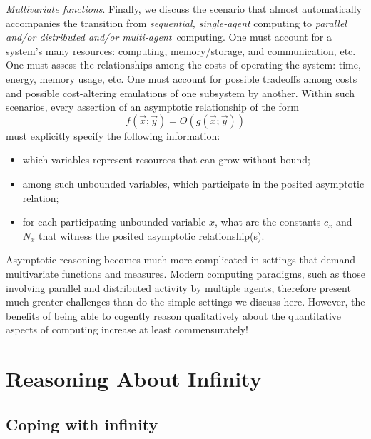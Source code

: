 {\em Multivariate functions}.
Finally, we discuss the scenario that almost automatically accompanies the transition from {\em sequential, single-agent} computing to {\em parallel and/or distributed and/or multi-agent}~computing.  One must account for a system's many resources: computing, memory/storage, and communication, etc.  One must assess the relationships among the costs of operating the system: time, energy, memory usage, etc.  One must account for possible tradeoffs among costs and possible cost-altering emulations of one subsystem by another. Within such scenarios, every assertion of an asymptotic relationship of the form
\[ f(\vec{x}; \vec{y}) = O(g(\vec{x}; \vec{y})) \]
must explicitly specify the following information:
\begin{itemize}
\item
which variables represent resources that can grow without bound;
\medskip\item
among such unbounded variables, which participate in the posited asymptotic relation;
\medskip\item
for each participating unbounded variable $x$, what are the constants $c_x$ and $N_x$ that witness the posited asymptotic relationship(s).
\end{itemize}

\medskip


Asymptotic reasoning becomes much more complicated in settings that demand multivariate functions and measures.  Modern computing paradigms, such as those involving parallel and distributed activity by multiple agents, therefore present much greater challenges than do the 
simple settings we discuss here.  However, the benefits of being able to cogently reason qualitatively about the quantitative aspects of computing increase at least commensurately!

\section{Reasoning About Infinity}
\label{sec:reasoning-infinity}

\subsection{Coping with infinity}
\label{sec:coping-infinity}

